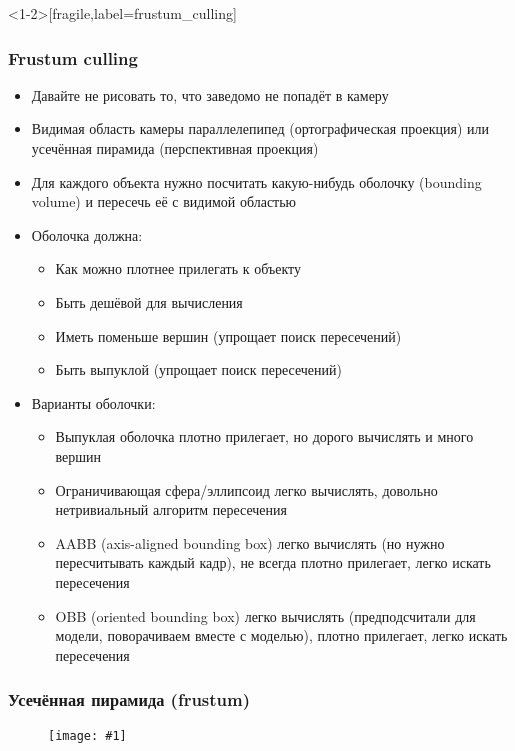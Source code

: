 \documentclass{beamer}
\newcommand{\slideimage}[1]{
  \begin{figure}
    \begin{adjustbox}{width=\textwidth, totalheight=\textheight-2\baselineskip-2\baselineskip,keepaspectratio}
      \texttt{[image: \#1]}
    \end{adjustbox}
  \end{figure}
}
\begin{document}
\begin{frame}<1-2>[fragile,label=frustum_culling]
\fontsize{10pt}{10pt}
\frametitle{Frustum culling}
\begin{itemize}
\item Давайте не рисовать то, что заведомо не попадёт в камеру
\pause
\item Видимая область камеры \textendash{} параллелепипед (ортографическая проекция) или усечённая пирамида (перспективная проекция)
\pause
\item Для каждого объекта нужно посчитать какую-нибудь оболочку (bounding volume) и пересечь её с видимой областью
\pause
\item Оболочка должна:
\begin{itemize}
\item Как можно плотнее прилегать к объекту
\pause
\item Быть дешёвой для вычисления
\pause
\item Иметь поменьше вершин (упрощает поиск пересечений)
\pause
\item Быть выпуклой (упрощает поиск пересечений)
\end{itemize}
\pause
\item Варианты оболочки:
\begin{itemize}
\item Выпуклая оболочка \textendash{} плотно прилегает, но дорого вычислять и много вершин
\pause
\item Ограничивающая сфера/эллипсоид \textendash{} легко вычислять, довольно нетривиальный алгоритм пересечения
\pause
\item AABB (axis-aligned bounding box) \textendash{} легко вычислять (но нужно пересчитывать каждый кадр), не всегда плотно прилегает, легко искать пересечения
\pause
\item OBB (oriented bounding box) \textendash{} легко вычислять (предподсчитали для модели, поворачиваем вместе с моделью), плотно прилегает, легко искать пересечения
\end{itemize}
\end{itemize}
\end{frame}

\begin{frame}[fragile]
\frametitle{Усечённая пирамида (frustum)}
\slideimage{frustum.png}
\end{frame}

\end{document}
